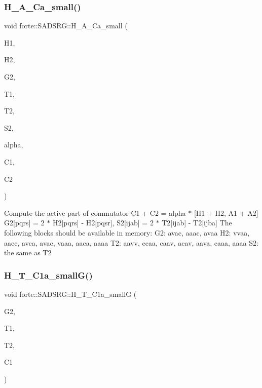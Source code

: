 \subsubsection{\texorpdfstring{H\+\_\+\+A\+\_\+\+Ca\+\_\+small()}{H\_A\_Ca\_small()}}
{\footnotesize\ttfamily void forte\+::\+S\+A\+D\+S\+R\+G\+::\+H\+\_\+\+A\+\_\+\+Ca\+\_\+small (\begin{DoxyParamCaption}\item[{Blocked\+Tensor \&}]{H1,  }\item[{Blocked\+Tensor \&}]{H2,  }\item[{Blocked\+Tensor \&}]{G2,  }\item[{Blocked\+Tensor \&}]{T1,  }\item[{Blocked\+Tensor \&}]{T2,  }\item[{Blocked\+Tensor \&}]{S2,  }\item[{const double \&}]{alpha,  }\item[{Blocked\+Tensor \&}]{C1,  }\item[{Blocked\+Tensor \&}]{C2 }\end{DoxyParamCaption})\hspace{0.3cm}{\ttfamily [protected]}}

Compute the active part of commutator C1 + C2 = alpha $\ast$ \mbox{[}H1 + H2, A1 + A2\mbox{]} G2\mbox{[}pqrs\mbox{]} = 2 $\ast$ H2\mbox{[}pqrs\mbox{]} -\/ H2\mbox{[}pqsr\mbox{]}, S2\mbox{[}ijab\mbox{]} = 2 $\ast$ T2\mbox{[}ijab\mbox{]} -\/ T2\mbox{[}ijba\mbox{]} The following blocks should be available in memory\+: G2\+: avac, aaac, avaa H2\+: vvaa, aacc, avca, avac, vaaa, aaca, aaaa T2\+: aavv, ccaa, caav, acav, aava, caaa, aaaa S2\+: the same as T2\mbox{\label{classforte_1_1_s_a_d_s_r_g_a8b34a6c248c3051ec9018264a740c706}} 
\subsubsection{\texorpdfstring{H\+\_\+\+T\+\_\+\+C1a\+\_\+small\+G()}{H\_T\_C1a\_smallG()}}
{\footnotesize\ttfamily void forte\+::\+S\+A\+D\+S\+R\+G\+::\+H\+\_\+\+T\+\_\+\+C1a\+\_\+smallG (\begin{DoxyParamCaption}\item[{Blocked\+Tensor \&}]{G2,  }\item[{Blocked\+Tensor \&}]{T1,  }\item[{Blocked\+Tensor \&}]{T2,  }\item[{Blocked\+Tensor \&}]{C1 }\end{DoxyParamCaption})\hspace{0.3cm}{\ttfamily [protected]}}




